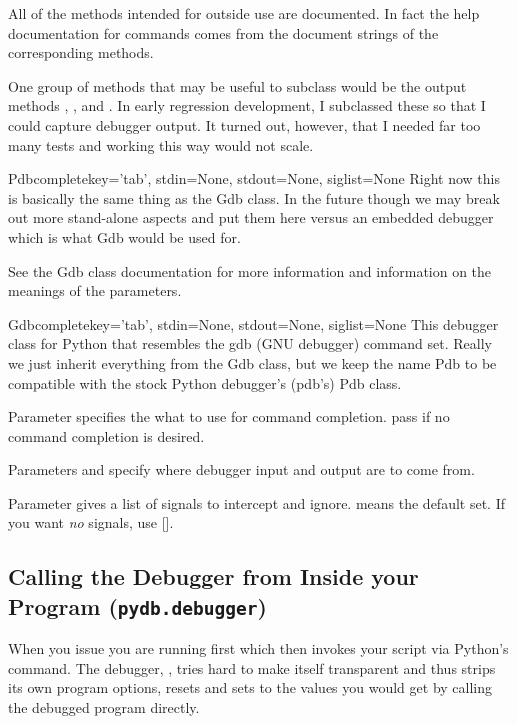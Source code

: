 All of the methods intended for outside use are documented. In fact
the help documentation for commands comes from the document strings of
the corresponding methods.

One group of methods that may be useful to subclass would be the
output methods , , and
. In early regression development, I subclassed these
so that I could capture debugger output. It turned out, however, that
I needed far too many tests and working this way would not scale.

\begin{classdesc}{Pdb}{completekey='tab', stdin=None, stdout=None,
                  siglist=None}\label{Pdb}
Right now this is basically the same thing as the Gdb class. In the
future though we may break out more stand-alone aspects and put them here
versus an embedded debugger which is what Gdb would be used for.

See the Gdb class documentation for more information and information on
the meanings of the parameters.
\end{classdesc}

\begin{classdesc}{Gdb}{completekey='tab', stdin=None, stdout=None,
                  siglist=None}\label{Gdb}
This debugger class for Python that resembles the gdb (GNU debugger)
command set. Really we just inherit everything from the Gdb class,
but we keep the name Pdb to be compatible with the stock Python
debugger's (pdb's) Pdb class.

Parameter  specifies the what to use for command completion.
pass  if no command completion is desired.

Parameters  and  specify where debugger input
and output are to come from.
    
Parameter  gives a list of signals to intercept and
ignore.  means the default set. If you want \emph{no}
signals, use [].
\end{classdesc}

\subsection{Calling the Debugger from Inside your Program ({\tt pydb.debugger})}\label{subsection-calling-pydb-inside-program}

When you issue  you are running 
first which then invokes your script  via Python's
 command. The debugger, , tries hard to make
itself transparent and thus strips its own program options, resets
 and sets  to the values you would get
by calling the debugged program directly.

